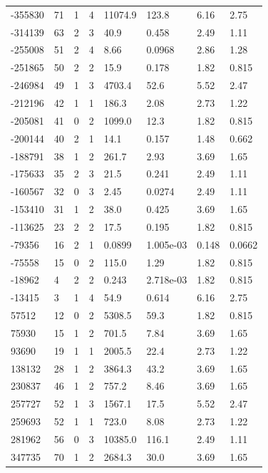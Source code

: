 \documentclass[preview]{standalone}
\begin{document}
{{\begin{tabular}{L{1.2cm}C{1.2cm} C{0.3cm}C{0.5cm} C{1.4cm}C{1.4cm} C{1.4cm}C{1.4cm}}
  -355830  &    71  & 1     &  4 &  11074.9  & 123.8  & 6.16 &  2.75   \\ 
  -314139  &    63  & 2     &  3 &  40.9  & 0.458  & 2.49 &  1.11   \\ 
  -255008  &    51  & 2     &  4 &  8.66  & 0.0968  & 2.86 &  1.28   \\ 
  -251865  &    50  & 2     &  2 &  15.9  & 0.178  & 1.82 &  0.815   \\ 
  -246984  &    49  & 1     &  3 &  4703.4  & 52.6  & 5.52 &  2.47   \\ 
  -212196  &    42  & 1     &  1 &  186.3  & 2.08  & 2.73 &  1.22   \\ 
  -205081  &    41  & 0     &  2 &  1099.0  & 12.3  & 1.82 &  0.815   \\ 
  -200144  &    40  & 2     &  1 &  14.1  & 0.157  & 1.48 &  0.662   \\ 
  -188791  &    38  & 1     &  2 &  261.7  & 2.93  & 3.69 &  1.65   \\ 
  -175633  &    35  & 2     &  3 &  21.5  & 0.241  & 2.49 &  1.11   \\ 
  -160567  &    32  & 0     &  3 &  2.45  & 0.0274  & 2.49 &  1.11   \\ 
  -153410  &    31  & 1     &  2 &  38.0  & 0.425  & 3.69 &  1.65   \\ 
  -113625  &    23  & 2     &  2 &  17.5  & 0.195  & 1.82 &  0.815   \\ 
  -79356  &    16  & 2     &  1 &  0.0899  & 1.005e-03  & 0.148 &  0.0662   \\ 
  -75558  &    15  & 0     &  2 &  115.0  & 1.29  & 1.82 &  0.815   \\ 
  -18962  &     4  & 2     &  2 &  0.243  & 2.718e-03  & 1.82 &  0.815   \\ 
  -13415  &     3  & 1     &  4 &  54.9  & 0.614  & 6.16 &  2.75   \\ 
  57512  &    12  & 0     &  2 &  5308.5  & 59.3  & 1.82 &  0.815   \\ 
  75930  &    15  & 1     &  2 &  701.5  & 7.84  & 3.69 &  1.65   \\ 
  93690  &    19  & 1     &  1 &  2005.5  & 22.4  & 2.73 &  1.22   \\ 
  138132  &    28  & 1     &  2 &  3864.3  & 43.2  & 3.69 &  1.65   \\ 
  230837  &    46  & 1     &  2 &  757.2  & 8.46  & 3.69 &  1.65   \\ 
  257727  &    52  & 1     &  3 &  1567.1  & 17.5  & 5.52 &  2.47   \\ 
  259693  &    52  & 1     &  1 &  723.0  & 8.08  & 2.73 &  1.22   \\ 
  281962  &    56  & 0     &  3 &  10385.0  & 116.1  & 2.49 &  1.11   \\ 
  347735  &    70  & 1     &  2 &  2684.3  & 30.0  & 3.69 &  1.65   \\ 
\hline 
\end{tabular} 

}}
\end{document}
